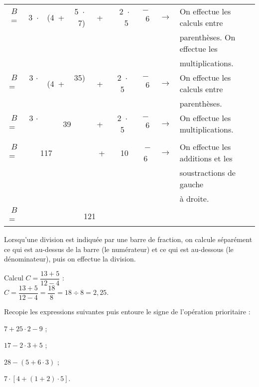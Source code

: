 \begin{methode*1}
\begin{exemple*1}
\begin{center}
\begin{tabularx}{1.2\linewidth}{ccccccccX}
$B$=	 	& 3 $\cdot$	& (4 +	& 5 $\cdot$ 7)	& + & 2 $\cdot$  5	& $-$ 6	& $\rightarrow$ & On effectue les calculs entre \\ \cline{4-4}
&&&&&&&&  parenthèses. On effectue les\\
&&&&&&&& multiplications. \\
$B$= 	& 3 $\cdot$  	& (4 + 	&  35)  		&+ & 2 $\cdot$  5 	&$-$ 6  	& $\rightarrow$ & On effectue les calculs entre\\ \cline{3-4}
 &&&&&&&& parenthèses.\\
$B$= 	& 3 $\cdot$  	&    \multicolumn{2}{c}{39}      		     		& + & 2 $\cdot$  5 	&$-$ 6  	& $\rightarrow$ & On effectue les multiplications.\\ \cline{2-3}\cline{6-6}
 &&&&&&&& \\
$B$= 	&      		\multicolumn{2}{c}{117} &             			& +  & 10  			& $-$6  	& $\rightarrow$ & On effectue les additions et les \\ \cline{2-7}
 &&&&&&&& soustractions de gauche\\
 &&&&&&&& à droite.\\
$B$= 	&                \multicolumn{6}{c}{121}                             								&  & \\
\end{tabularx}
\end{center}
\end{exemple*1}


\begin{aconnaitre}
Lorsqu’une division est indiquée par une barre de fraction, on calcule séparément ce qui est au-dessus de la barre (le numérateur) et ce qui est au-dessous (le dénominateur), puis on effectue la division.
\end{aconnaitre}

\begin{exemple*1}
Calcul $C = \dfrac{13 + 5}{12 - 4}$ : \\[1em]
$C = \dfrac{13 + 5}{12 - 4} = \dfrac{18}{8} = 18 \div 8 = 2,25$.
\end{exemple*1}

\exercice 
Recopie les expressions suivantes puis entoure le signe de l'opération prioritaire :
\begin{colenumerate}{2}
 \item $7 + 25 \cdot 2 - 9$ ;
 \item $17 - 2 \cdot 3 + 5$ ;
 \item $28 - (5 + 6 \cdot 3)$ ;
 \item $7 \cdot [4  + (1 + 2) \cdot 5]$.
 \end{colenumerate}
 

\end{methode*1}
